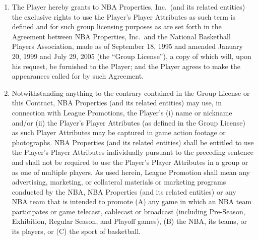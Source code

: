 \documentclass[
]{book}
\providecommand{\tightlist}{%
  \setlength{\itemsep}{0pt}\setlength{\parskip}{0pt}}
\begin{document}
\begin{enumerate}
\def\labelenumi{(\alph{enumi})}
\tightlist
\item
  The Player hereby grants to NBA Properties, Inc.~(and its related entities) the exclusive rights to use the Player's Player Attributes as such term is defined and for such group licensing purposes as are set forth in the Agreement between NBA Properties, Inc.~and the National Basketball Players Association, made as of September 18, 1995 and amended January 20, 1999 and July 29, 2005 (the ``Group License''), a copy of which will, upon his request, be furnished to the Player; and the Player agrees to make the appearances called for by such Agreement.
\item
  Notwithstanding anything to the contrary contained in the Group License or this Contract, NBA Properties (and its related entities) may use, in connection with League Promotions, the Player's (i) name or nickname and/or (ii) the Player's Player Attributes (as defined in the Group License) as such Player Attributes may be captured in game action footage or photographs. NBA Properties (and its related entities) shall be entitled to use the Player's Player Attributes individually pursuant to the preceding sentence and shall not be required to use the Player's Player Attributes in a group or as one of multiple players. As used herein, League Promotion shall mean any advertising, marketing, or collateral materials or marketing programs conducted by the NBA, NBA Properties (and its related entities) or any NBA team that is intended to promote (A) any game in which an NBA team participates or game telecast, cablecast or broadcast (including Pre-Season, Exhibition, Regular Season, and Playoff games), (B) the NBA, its teams, or its players, or (C) the sport of basketball.
\end{enumerate}
\end{document}
